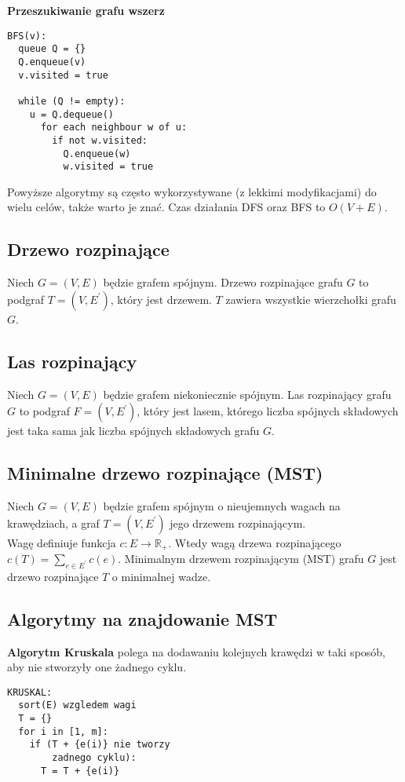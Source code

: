 \textbf{Przeszukiwanie grafu wszerz}
\begin{lstlisting}[style=code]
BFS(v):
  queue Q = {}
  Q.enqueue(v)
  v.visited = true
    
  while (Q != empty):
    u = Q.dequeue()
      for each neighbour w of u:
        if not w.visited:
          Q.enqueue(w)
          w.visited = true
\end{lstlisting}
Powyższe algorytmy są często wykorzystywane (z lekkimi modyfikacjami) 
do wielu celów, także warto je znać. Czas działania DFS oraz BFS to $O(V + E)$.

\subsection*{Drzewo rozpinające}
Niech $G = (V, E)$ będzie grafem spójnym. Drzewo rozpinające grafu $G$ to 
podgraf $T = (V, E^\prime)$, który jest drzewem. $T$ zawiera wszystkie
wierzchołki grafu $G$.

\subsection*{Las rozpinający}
Niech $G = (V, E)$ będzie grafem niekoniecznie spójnym. Las rozpinający
grafu $G$ to podgraf $F = (V, E^\prime)$, który jest lasem, którego liczba
spójnych składowych jest taka sama jak liczba spójnych składowych grafu $G$.

\subsection*{Minimalne drzewo rozpinające (MST)}
Niech $G = (V, E)$ będzie grafem spójnym o nieujemnych wagach na krawędziach, a
graf $T = (V, E^\prime)$ jego drzewem rozpinającym. \\
Wagę definiuje funkcja $c : E \to \mathbb{R}_+$. Wtedy wagą drzewa rozpinającego
$c(T) = \sum\limits_{e \in E^\prime} c(e)$. Minimalnym drzewem rozpinającym (MST)
grafu $G$ jest drzewo rozpinające $T$ o minimalnej wadze.

\subsection*{Algorytmy na znajdowanie MST}
\textbf{Algorytm Kruskala} polega na dodawaniu kolejnych krawędzi w taki sposób,
aby nie stworzyły one żadnego cyklu.
\begin{lstlisting}[style=code]
KRUSKAL:
  sort(E) wzgledem wagi
  T = {}
  for i in [1, m]:
    if (T + {e(i)} nie tworzy 
        zadnego cyklu):
      T = T + {e(i)}
\end{lstlisting}

